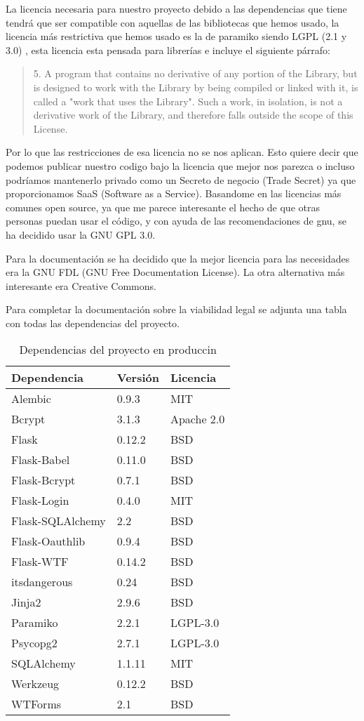 La licencia necesaria para nuestro proyecto debido a las dependencias que tiene tendrá que ser compatible con aquellas de las bibliotecas que hemos usado, la licencia más restrictiva que hemos usado es la de paramiko siendo LGPL (2.1 y 3.0)\cite{LGPL} , esta licencia esta pensada para librerías e incluye el siguiente párrafo:

\begin{quotation}5. A program that contains no derivative of any portion of the Library, but is designed to work with the Library by being compiled or linked with it, is called a "work that uses the Library". Such a work, in isolation, is not a derivative work of the Library, and therefore falls outside the scope of this License.
\end{quotation}

Por lo que las restricciones de esa licencia no se nos aplican. Esto quiere decir que podemos publicar nuestro codigo bajo la licencia que mejor nos parezca o incluso podríamos mantenerlo privado como un Secreto de negocio (Trade Secret) ya que proporcionamos SaaS (Software as a Service). Basandome en las licencias más comunes open source, ya que me parece interesante el hecho de que otras personas puedan usar el código, y con ayuda de las recomendaciones de gnu\cite{gnurecs}, se ha decidido usar la GNU GPL 3.0.

Para la documentación se ha decidido que la mejor licencia para las necesidades era la GNU FDL (GNU Free Documentation License). La otra alternativa más interesante era Creative Commons.

Para completar la documentación sobre la viabilidad legal se adjunta una tabla con todas las dependencias del proyecto.

\begin{table}[]
\centering
\begin{tabular}{lll}
\hline
Dependencia & Versión & Licencia \\ \hline
Alembic & 0.9.3 & MIT \\
Bcrypt & 3.1.3 & Apache 2.0 \\
Flask & 0.12.2 & BSD \\
Flask-Babel & 0.11.0 & BSD \\
Flask-Bcrypt & 0.7.1 & BSD \\
Flask-Login & 0.4.0 & MIT \\
Flask-SQLAlchemy & 2.2 & BSD \\
Flask-Oauthlib & 0.9.4 & BSD \\
Flask-WTF & 0.14.2 & BSD \\
itsdangerous & 0.24 & BSD \\
Jinja2 & 2.9.6 & BSD \\
Paramiko & 2.2.1 & LGPL-3.0 \\
Psycopg2 & 2.7.1 & LGPL-3.0 \\
SQLAlchemy &1.1.11 & MIT \\
Werkzeug & 0.12.2 & BSD \\
WTForms & 2.1 & BSD \\ \hline
\end{tabular}
\caption{Dependencias del proyecto en produccin}
\label{Dependencias en produccin}
\end{table}


